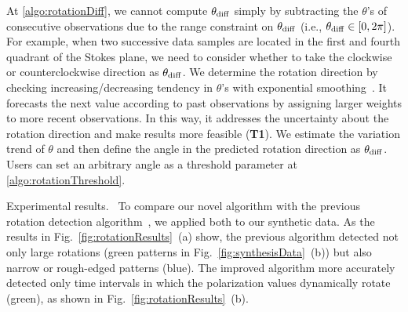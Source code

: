 At \ref{algo:rotationDiff}, we cannot compute $\theta_{\rm diff}$ simply by subtracting the $\theta$'s of consecutive observations 
due to the range constraint on $\theta_{\rm diff}$ (i.e., $\theta_{\rm diff} \in [0, 2\pi]$). 
For example, when two successive data samples are located in the first and fourth quadrant of the Stokes plane, 
we need to consider whether to take the clockwise or counterclockwise direction as $\theta_{\rm diff}$. 
We determine the rotation direction 
by checking increasing/decreasing tendency in $\theta$'s with exponential smoothing~\cite{Brown1956}.
It forecasts the next value according to past observations by assigning larger weights to more recent observations.
In this way, it addresses the uncertainty about the rotation direction and make results more feasible (\textbf{T1}).
We estimate the variation trend of $\theta$ and
then define the angle in the predicted rotation direction as $\theta_{\rm diff}$.
Users can set an arbitrary angle as a threshold parameter at \ref{algo:rotationThreshold}.

\textsf{Experimental results.\ } To compare our novel algorithm with the previous rotation detection algorithm~\cite{Sawada2018}, we applied both to our synthetic data.
As the results in Fig.~\ref{fig:rotationResults}~(a) show, 
the previous algorithm detected not only large rotations (green patterns in Fig.~\ref{fig:synthesisData}~(b)) but also narrow or rough-edged patterns (blue).
The improved algorithm more accurately detected only time intervals in which the polarization values dynamically rotate (green), as shown in Fig.~\ref{fig:rotationResults}~(b).